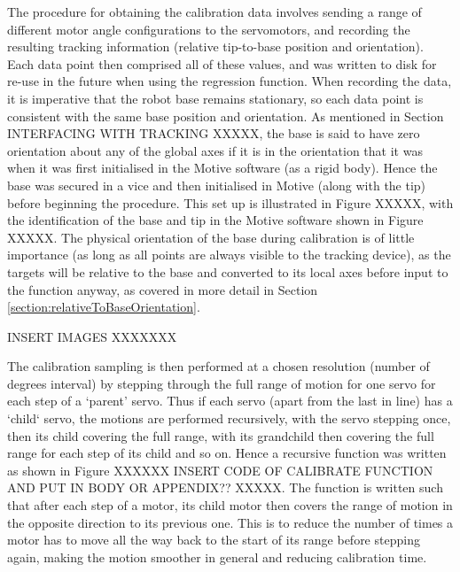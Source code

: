 \documentclass[11pt]{article}
\begin{document}
The procedure for obtaining the calibration data involves sending a range of different motor angle configurations to the servomotors, and recording the resulting tracking information (relative tip-to-base position and orientation). Each data point then comprised all of these values, and was written to disk for re-use in the future when using the regression function. When recording the data, it is imperative that the robot base remains stationary, so each data point is consistent with the same base position and orientation. As mentioned in Section INTERFACING WITH TRACKING XXXXX, the base is said to have zero orientation about any of the global axes if it is in the orientation that it was when it was first initialised in the Motive software (as a rigid body). Hence the base was secured in a vice and then initialised in Motive (along with the tip) before beginning the procedure. This set up is illustrated in Figure XXXXX, with the identification of the base and tip in the Motive software shown in Figure XXXXX. The physical orientation of the base during calibration is of little importance (as long as all points are always visible to the tracking device), as the targets will be relative to the base and converted to its local axes before input to the function anyway, as covered in more detail in Section \ref{section:relativeToBaseOrientation}.

INSERT IMAGES XXXXXXX


The calibration sampling is then performed at a chosen resolution (number of degrees interval) by stepping through the full range of motion for one servo for each step of a `parent' servo. Thus if each servo (apart from the last in line) has a `child` servo, the motions are performed recursively, with the servo stepping once, then its child covering the full range, with its grandchild then covering the full range for each step of its child and so on. Hence a recursive function was written as shown in Figure XXXXXX INSERT CODE OF CALIBRATE FUNCTION AND PUT IN BODY OR APPENDIX?? XXXXX. The function is written such that after each step of a motor, its child motor then covers the range of motion in the opposite direction to its previous one. This is to reduce the number of times a motor has to move all the way back to the start of its range before stepping again, making the motion smoother in general and reducing calibration time. 
\end{document}
